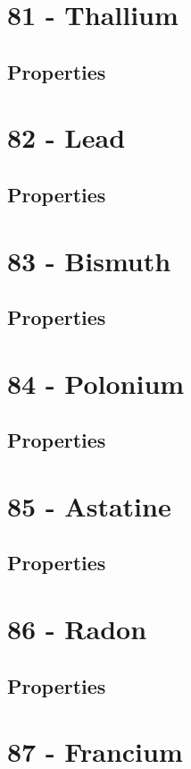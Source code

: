\documentclass{book}
\begin{document}
\section{81 - Thallium}
\label{sec:elem-thallium}
\subsection{Properties}

\section{82 - Lead}
\label{sec:elem-lead}
\subsection{Properties}

\section{83 - Bismuth}
\label{sec:elem-bismuth}
\subsection{Properties}

\section{84 - Polonium}
\label{sec:elem-polonium}
\subsection{Properties}

\section{85 - Astatine}
\label{sec:elem-astatine}
\subsection{Properties}

\section{86 - Radon}
\label{sec:elem-radon}
\subsection{Properties}

\section{87 - Francium}
\label{sec:elem-francium}
\end{document}
